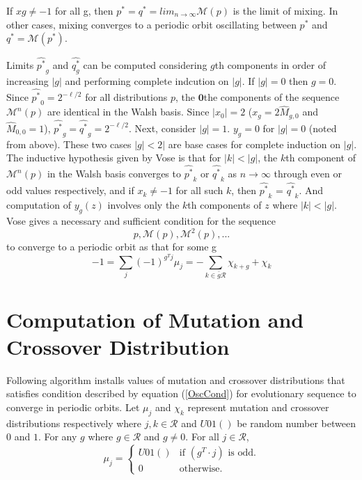 If $xg \neq −1$ for all g, then $p^\ast = q^\ast = lim_{n \rightarrow \infty} \mathcal{M}(p)$ is the limit of mixing. In other cases, mixing converges to a periodic orbit oscillating between $p^\ast$ and $q^\ast = \mathcal{M}(p^\ast)$.

Limits $\widehat{p^{\ast}}_g$ and $\widehat{q^{\ast}_g}$ can be computed considering $g$th components in order of increasing $|g|$ and performing complete indcution on $|g|$. If $|g| = 0$ then $g = 0$. Since $\widehat{p^\ast}_0 = 2^{-\ell/2}$ for all distributions $p$, the $\textbf{0}$the components of the sequence $\mathcal{M}^n(p)$ are identical in the Walsh basis. Since $|x_0| = 2$ ($x_g = 2\widehat{M}_{g,0}$ and $\widehat{M}_{0,0} = 1$), $\widehat{p^{\ast}}_g = \widehat{q^{\ast}}_g = 2^{-\ell/2}$. Next, consider $|g| = 1$. $y_g = 0$ for $|g| = 0$ (noted from above). These two cases $|g| < 2|$ are base cases for complete induction on $|g|$. The inductive hypothesis given by Vose is that for $|k| < |g|$, the $k$th component of $\mathcal{M}^n(p)$ in the Walsh basis converges to $\widehat{p^{\ast}}_k$ or $\widehat{q^{\ast}}_k$ as $n \rightarrow \infty$ through even or odd values respectively, and if $x_k \neq -1$ for all such $k$, then $\widehat{p^{\ast}}_k$ = $\widehat{q^{\ast}}_k$. And computation of $y_g(z)$ involves only the $k$th components of $z$ where $|k| < |g|$. 
\newline 
Vose gives a necessary and sufficient condition for the sequence
\[
p, \mathcal{M}(p), \mathcal{M}^2(p),...
\]
to converge to a periodic orbit as that for some g
\begin{equation}
\label{OscCond}
-1 = \sum \limits_{j} (-1)^{g^T j} \mu_j = - \sum \limits_{k \in \bar{g}\mathcal{R}} \chi_{k+g} + \chi_k
\end{equation}
 
\section{Computation of Mutation and Crossover Distribution}
Following algorithm installs values of mutation and crossover distributions that satisfies condition described by equation (\ref{OscCond}) for evolutionary sequence to converge in periodic orbits.
Let $\mu_j$ and $\chi_k$ represent mutation and crossover distributions respectively where $j,k \in \mathcal{R}$ and $U01()$ be random number between $0$ and $1$. For any $g$ where $g \in \mathcal{R}$ and $g \neq 0$.
For all $j \in \mathcal{R}$,
\[
\mu_j = \begin{cases}
    U01() & \text{if $(g^T\cdot j)$ is odd}.\\
    0 & \text{otherwise}.
  \end{cases}
\]

